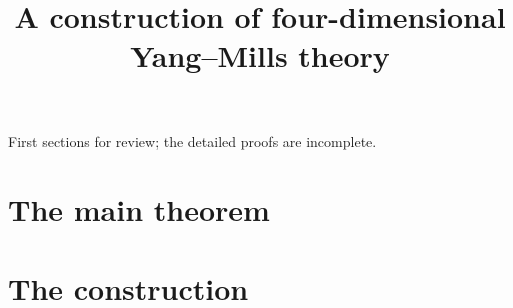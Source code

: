 \documentclass[11pt,letterpaper]{article}
\title{A construction of four-dimensional Yang--Mills theory}
\author{}
\date{}
\numberwithin{equation}{section}
\theoremstyle{plain}
\theoremstyle{definition}
\theoremstyle{remark}
\begin{document}
\maketitle
\begin{center}\small First sections for review; the detailed proofs are incomplete.\end{center}
\tableofcontents
\clearpage
\part{The main theorem}\label{part:main}






\clearpage
\part{The construction}\label{part:construction}

















\end{document}
